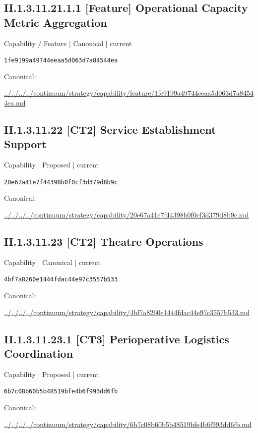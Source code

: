\documentclass[10pt,a4paper]{article}
\begin{document}
\subsection*{II.1.3.11.21.1.1 [Feature] Operational Capacity Metric Aggregation}
{\small Capability / Feature | Canonical | current}\par
\texttt{1fe9199a49744eeaa5d063d7a84544ea}\par
Canonical: \par
{\footnotesize\url{../../../../continuum/strategy/capability/feature/1fe9199a49744eeaa5d063d7a84544ea.md}}\par
\subsection*{II.1.3.11.22 [CT2] Service Establishment Support}
{\small Capability | Proposed | current}\par
\texttt{20e67a41e7f44398b0f0cf3d379d8b9c}\par
Canonical: \par
{\footnotesize\url{../../../../continuum/strategy/capability/20e67a41e7f44398b0f0cf3d379d8b9c.md}}\par
\subsection*{II.1.3.11.23 [CT2] Theatre Operations}
{\small Capability | Canonical | current}\par
\texttt{4bf7a8260e1444fdac44e97c3557b533}\par
Canonical: \par
{\footnotesize\url{../../../../continuum/strategy/capability/4bf7a8260e1444fdac44e97c3557b533.md}}\par
\subsection*{II.1.3.11.23.1 [CT3] Perioperative Logistics Coordination}
{\small Capability | Proposed | current}\par
\texttt{6b7c08b60b5b48519bfe4b6f993dd6fb}\par
Canonical: \par
{\footnotesize\url{../../../../continuum/strategy/capability/6b7c08b60b5b48519bfe4b6f993dd6fb.md}}\par
\end{document}
